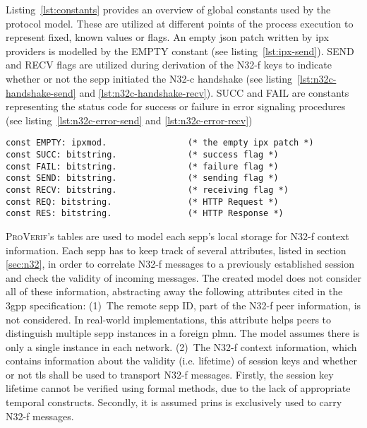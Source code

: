 Listing~\ref{lst:constants} provides an overview of global constants used by the protocol model.
These are utilized at different points of the process execution to represent fixed, known values or flags.
An empty \gls{json} patch written by \gls{ipx} providers is modelled by the {\sffamily EMPTY} constant (see listing~\ref{lst:ipx-send}).
{\sffamily SEND} and {\sffamily RECV} flags are utilized during derivation of the N32-f keys to indicate whether or not the \gls{sepp} initiated the N32-c handshake (see listing~\ref{lst:n32c-handshake-send} and \ref{lst:n32c-handshake-recv}).
{\sffamily SUCC} and {\sffamily FAIL} are constants representing the status code for success or failure in error signaling procedures (see listing~\ref{lst:n32c-error-send} and \ref{lst:n32c-error-recv})

\begin{lstlisting}[caption={Global constant declarations},label={lst:constants},firstnumber=24]
const EMPTY: ipxmod.                (* the empty ipx patch *)
const SUCC: bitstring.              (* success flag *)
const FAIL: bitstring.              (* failure flag *)
const SEND: bitstring.              (* sending flag *)
const RECV: bitstring.              (* receiving flag *)
const REQ: bitstring.               (* HTTP Request *)
const RES: bitstring.               (* HTTP Response *)
\end{lstlisting}

\textsc{ProVerif}'s tables are used to model each \gls{sepp}'s local storage for N32-f context information.
Each \gls{sepp} has to keep track of several attributes, listed in section \ref{sec:n32}, in order to correlate N32-f messages to a previously established session and check the validity of incoming messages.
The created model does not consider all of these information, abstracting away the following attributes cited in the \gls{3gpp} specification:
(1)~The remote \gls{sepp} ID, part of the N32-f peer information, is not considered.
In real-world implementations, this attribute helps peers to distinguish multiple \gls{sepp} instances in a foreign \gls{plmn}.
The model assumes there is only a single instance in each network.
(2)~The N32-f context information, which contains information about the validity (i.e. lifetime) of session keys and whether or not \gls{tls} shall be used to transport N32-f messages.
Firstly, the session key lifetime cannot be verified using formal methods, due to the lack of appropriate temporal constructs.
Secondly, it is assumed \gls{prins} is exclusively used to carry N32-f messages.

